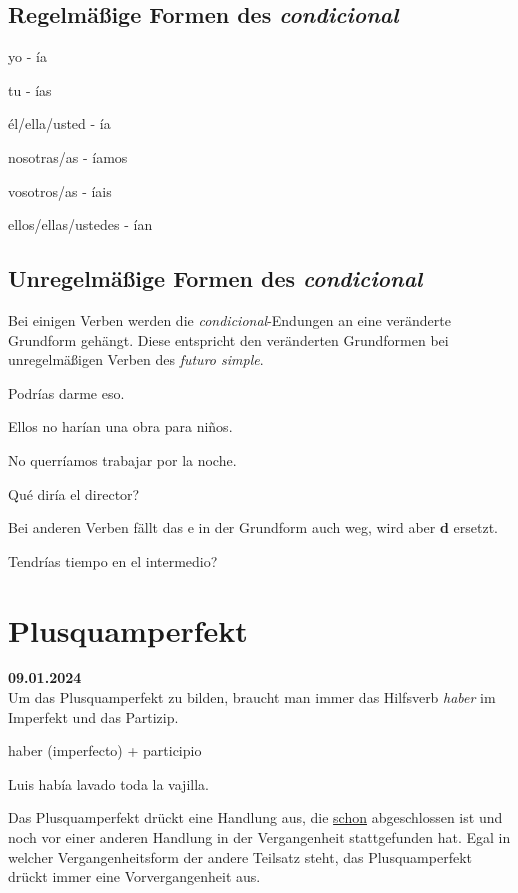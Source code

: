 \subsection*{Regelmäßige Formen des \textit{condicional}}
\begin{gramatica}
    \item yo - \'ia
    \item tu - \'ias
    \item \'el/ella/usted - \'ia
    \item nosotras/as - \'iamos
    \item vosotros/as - \'iais
    \item ellos/ellas/ustedes - \'ian
\end{gramatica}
\subsection*{Unregelmäßige Formen des \textit{condicional}}
Bei einigen Verben werden die \textit{condicional}-Endungen 
an eine veränderte Grundform gehängt. Diese entspricht den
veränderten Grundformen bei unregelmäßigen Verben des 
\textit{futuro simple}.
\begin{ejemplos}
    \item Podr\'ias darme eso.
    \item Ellos no har\'ian una obra para ni\~nos.
    \item No querr\'iamos trabajar por la noche.
    \item Qu\'e dir\'ia el director?
\end{ejemplos}
Bei anderen Verben fällt das e in der Grundform auch weg,
wird aber \textbf{d} ersetzt.
\begin{ejemplos}
    \item Tendr\'ias tiempo en el intermedio?
\end{ejemplos}
\section{Plusquamperfekt}
\textbf{09.01.2024}\\
Um das Plusquamperfekt zu bilden, braucht man immer das Hilfsverb
\textit{haber} im Imperfekt und das Partizip.
\begin{gramatica}
    \item haber (imperfecto) + participio
\end{gramatica}
\begin{ejemplos}
    \item Luis hab\'ia lavado toda la vajilla.
\end{ejemplos}
Das Plusquamperfekt drückt eine Handlung aus, die \underline{schon}
abgeschlossen ist und noch vor einer anderen Handlung in der
Vergangenheit stattgefunden hat. Egal in welcher Vergangenheitsform
der andere Teilsatz steht, das Plusquamperfekt drückt immer eine
Vorvergangenheit aus.
